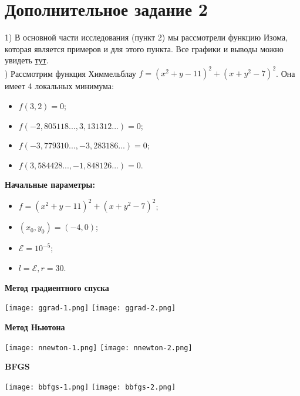 \documentclass{article}
\begin{document}
\section*{Дополнительное задание 2}

1) В основной части исследования (пункт 2) мы рассмотрели функцию Изома, которая является примеров и для этого пункта. Все графики и выводы можно увидеть \hyperlink{page.8}{тут}. \\

) Рассмотрим функция Химмельблау $f = (x^2 + y - 11)^2 + (x + y^2 - 7)^2$. Она имеет 4 локальных минимума: 
\begin{itemize}
   \item $f(3,2)=0$;
   \item $f(-2{,}805118...,3{,}131312...)=0$;
   \item $f(-3{,}779310...,-3{,}283186...)=0$;
   \item $f(3{,}584428...,-1{,}848126...)=0$.
\end{itemize}

\noindent \textbf{Начальные параметры:}
\begin{itemize}
    \item $f = (x^2 + y - 11)^2 + (x + y^2 - 7)^2$;
     \item $(x_0, y_0) = (-4, 0)$;
    \item $\mathcal{E} = 10^{-5}$;
    \item $l = \mathcal{E}, r = 30$.
\end{itemize}

\noindent \textbf{Метод градиентного спуска}
\begin{center}
    \texttt{[image: ggrad-1.png]}
    \texttt{[image: ggrad-2.png]}
    \label{fig:enter-label}
\end{center}

\noindent \textbf{Метод Ньютона}
\begin{center}
    \texttt{[image: nnewton-1.png]}
    \texttt{[image: nnewton-2.png]}
    \label{fig:enter-label}
\end{center}

\noindent \textbf{BFGS}
\begin{center}
    \texttt{[image: bbfgs-1.png]}
    \texttt{[image: bbfgs-2.png]}
    \label{fig:enter-label}
\end{center}
\end{document}
